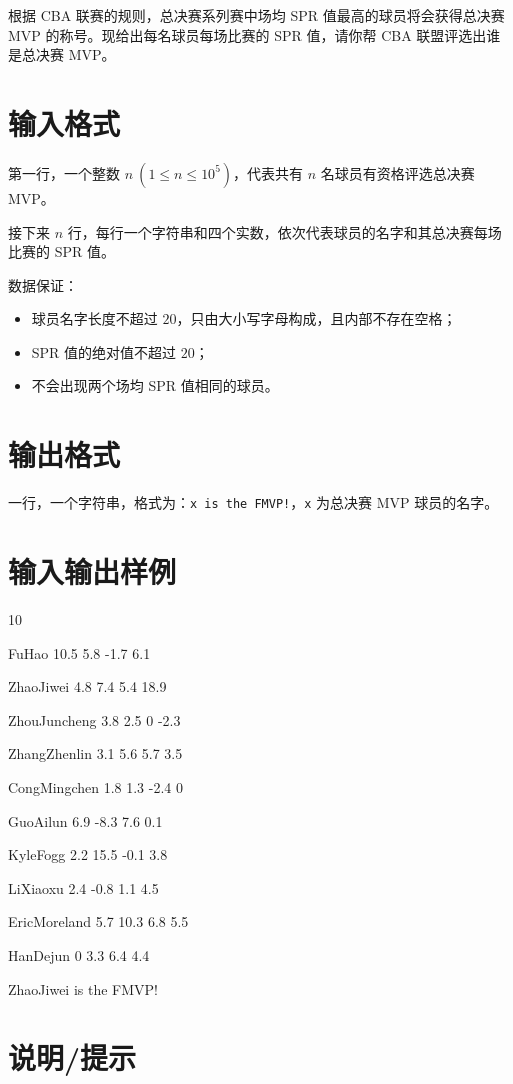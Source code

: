 \documentclass{../cpct/ctpro}
\begin{document}
根据 CBA 联赛的规则，总决赛系列赛中场均 SPR 值最高的球员将会获得总决赛 MVP 的称号。现给出每名球员每场比赛的 SPR 值，请你帮 CBA 联盟评选出谁是总决赛 MVP。

\section*{输入格式}

第一行，一个整数 $n~(1 \leq n \leq {10}^5)$，代表共有 $n$ 名球员有资格评选总决赛 MVP。

接下来 $n$ 行，每行一个字符串和四个实数，依次代表球员的名字和其总决赛每场比赛的 SPR 值。

数据保证：

\begin{itemize}
    \item 球员名字长度不超过 $20$，只由大小写字母构成，且内部不存在空格；
    \item SPR 值的绝对值不超过 $20$；
    \item 不会出现两个场均 SPR 值相同的球员。
\end{itemize}

\section*{输出格式}

一行，一个字符串，格式为：\texttt{x is the FMVP!}，\texttt{x} 为总决赛 MVP 球员的名字。

\section*{输入输出样例}

\testcasetab
{
    10\par
    FuHao 10.5 5.8 -1.7 6.1\par
    ZhaoJiwei 4.8 7.4 5.4 18.9\par
    ZhouJuncheng 3.8 2.5 0 -2.3\par
    ZhangZhenlin 3.1 5.6 5.7 3.5\par
    CongMingchen 1.8 1.3 -2.4 0\par
    GuoAilun 6.9 -8.3 7.6 0.1\par
    KyleFogg 2.2 15.5 -0.1 3.8\par
    LiXiaoxu 2.4 -0.8 1.1 4.5\par
    EricMoreland 5.7 10.3 6.8 5.5\par
    HanDejun 0 3.3 6.4 4.4
}
{
    ZhaoJiwei is the FMVP!
}

\clearpage
\section*{说明/提示}
\end{document}
